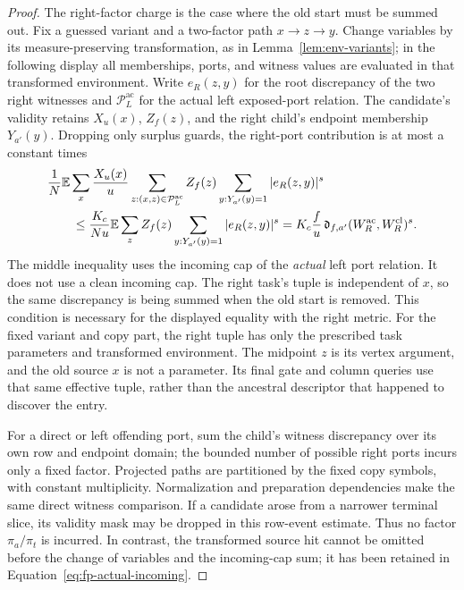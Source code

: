 \begin{proof}
The right-factor charge is the case where the old start must be summed
out.  Fix a guessed variant and a two-factor path $x\to z\to y$.
Change variables by its measure-preserving transformation, as in
Lemma~\ref{lem:env-variants}; in the following display all memberships,
ports, and witness values are evaluated in that transformed environment.
Write $e_R(z,y)$ for the root discrepancy of the two right witnesses and
$\mathcal P^{\mathrm{ac}}_L$ for the actual left exposed-port relation.
The candidate's validity retains $X_u(x)$, $Z_f(z)$, and the right
child's endpoint membership $Y_{a'}(y)$.  Dropping only surplus guards,
the right-port contribution is at most a constant times
\begin{align}
 &\frac1N\mathbb E\sum_x\frac{X_u(x)}u
       \sum_{z:(x,z)\in\mathcal P^{\mathrm{ac}}_L}Z_f(z)
       \sum_{y:Y_{a'}(y)=1}|e_R(z,y)|^s \notag\\
 &\qquad\le\frac{K_c}{N u}\mathbb E\sum_z Z_f(z)
       \sum_{y:Y_{a'}(y)=1}|e_R(z,y)|^s
   =K_c\frac f u\,\mathfrak d_{f,a'}(W_R^{\mathrm{ac}},
                                      W_R^{\mathrm{cl}})^s.
 \label{eq:fp-actual-incoming}
\end{align}
The middle inequality uses the incoming cap of the \emph{actual} left
port relation.  It does not use a clean incoming cap.  The right task's
tuple is independent of $x$, so the same discrepancy is being summed
when the old start is removed.  This condition is necessary for the
displayed equality with the right metric.
For the fixed variant and copy part, the right tuple has only the
prescribed task parameters and transformed environment.  The midpoint
$z$ is its vertex argument, and the old source $x$ is not a parameter.
Its final gate and column queries use that same effective tuple, rather
than the ancestral descriptor that happened to discover the entry.

For a direct or left offending port, sum the child's witness discrepancy
over its own row and endpoint domain; the bounded number of possible
right ports incurs only a fixed factor.  Projected paths are partitioned
by the fixed copy symbols, with constant multiplicity.  Normalization
and preparation dependencies make the same direct witness comparison.
If a candidate arose from a narrower terminal slice, its validity mask
may be dropped in this row-event estimate.  Thus no factor
$\pi_a/\pi_t$ is incurred.  In contrast, the transformed source hit
cannot be omitted before the change of variables and the incoming-cap
sum; it has been retained in Equation~\eqref{eq:fp-actual-incoming}.


\end{proof}
